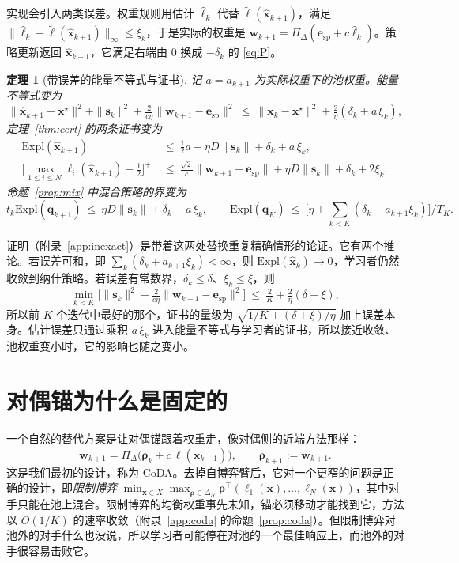\documentclass{article}
\theoremstyle{plain}
\newtheorem{theorem}{定理}[section]
\theoremstyle{remark}
\newcommand{\Expl}{\mathrm{Expl}}
\newcommand{\Proj}{\Pi}
\newcommand{\simplex}{\Delta}
\newcommand{\bx}{{\bm{x}}}
\newcommand{\bw}{{\bm{w}}}
\newcommand{\bq}{{\bm{q}}}
\newcommand{\be}{{\bm{e}}}
\newcommand{\brho}{{\bm{\rho}}}
\newcommand{\bell}{{\bm{\ell}}}
\newcommand{\aug}{\tilde{\bell}}
\newcommand{\xs}{\bx^{\star}}
\newcommand{\dx}{{\bm{s}}}
\newcommand{\esp}{\be_{\mathrm{sp}}}
\newcommand{\coda}{CoDA}
\begin{document}
实现会引入两类误差。权重规则用估计 $\hat{\bell}_k$ 代替 $\aug(\hat \bx_{k+1})$，满足 $\|\hat{\bell}_k-\aug(\hat \bx_{k+1})\|_\infty\le\xi_k$，于是实际的权重是 $\bw_{k+1}=\Proj_\simplex(\esp+c\hat{\bell}_k)$。策略更新返回 $\hat \bx_{k+1}$，它满足右端由 $0$ 换成 $-\delta_k$ 的 \eqref{eq:P}。
\begin{theorem}[带误差的能量不等式与证书]
\label{thm:inexact}
记 $a=a_{k+1}$ 为实际权重下的池权重。能量不等式变为
\[
\|\hat \bx_{k+1}-\xs\|^2+\|\dx_k\|^2+\tfrac{2}{c\eta}\|\bw_{k+1}-\esp\|^2\ \le\ \|\bx_k-\xs\|^2+\tfrac2\eta(\delta_k+a\,\xi_k),
\]
定理~\ref{thm:cert} 的两条证书变为
\begin{align*}
\Expl(\hat \bx_{k+1})&\ \le\ \tfrac12a+\eta D\|\dx_k\|+\delta_k+a\,\xi_k,\\
\Big[\max_{1\le i\le N}\ell_i(\hat \bx_{k+1})-\tfrac12\Big]^+&\ \le\ \tfrac{\sqrt2}{c}\|\bw_{k+1}-\esp\|+\eta D\|\dx_k\|+\delta_k+2\xi_k,
\end{align*}
命题~\ref{prop:mix} 中混合策略的界变为
\[
t_k\Expl(\bq_{k+1})\ \le\ \eta D\|\dx_k\|+\delta_k+a\,\xi_k,\qquad
\Expl(\bar{\bq}_K)\ \le\ \Big[\eta+\textstyle\sum_{k<K}(\delta_k+a_{k+1}\xi_k)\Big]\big/T_K .
\]
\end{theorem}
证明（附录~\ref{app:inexact}）是带着这两处替换重复精确情形的论证。它有两个推论。若误差可和，即 $\sum_k(\delta_k+a_{k+1}\xi_k)<\infty$，则 $\Expl(\hat\bx_k)\to0$，学习者仍然收敛到纳什策略。若误差有常数界，$\delta_k\le\delta$、$\xi_k\le\xi$，则
\[
\min_{k<K}\Big[\|\dx_k\|^2+\tfrac{2}{c\eta}\|\bw_{k+1}-\esp\|^2\Big]\ \le\ \tfrac2K+\tfrac2\eta(\delta+\xi) ,
\]
所以前 $K$ 个迭代中最好的那个，证书的量级为 $\sqrt{1/K+(\delta+\xi)/\eta}$ 加上误差本身。估计误差只通过乘积 $a\,\xi_k$ 进入能量不等式与学习者的证书，所以接近收敛、池权重变小时，它的影响也随之变小。

\section{对偶锚为什么是固定的}
\label{sec:coda}

一个自然的替代方案是让对偶锚跟着权重走，像对偶侧的近端方法那样：
\[
\bw_{k+1}=\Proj_\simplex\big(\brho_k+c\,\aug(\bx_{k+1})\big),\qquad\brho_{k+1}:=\bw_{k+1}.
\]
这是我们最初的设计，称为 \coda{}。去掉自博弈臂后，它对一个更窄的问题是正确的设计，即\emph{限制博弈} $\min_{\bx\in X}\max_{\brho\in\simplex_N}\brho^\top(\ell_1(\bx),\dots,\ell_N(\bx))$，其中对手只能在池上混合。限制博弈的均衡权重事先未知，锚必须移动才能找到它，方法以 $O(1/K)$ 的速率收敛（附录~\ref{app:coda} 的命题~\ref{prop:coda}）。但限制博弈对池外的对手什么也没说，所以学习者可能停在对池的一个最佳响应上，而池外的对手很容易击败它。
\end{document}
